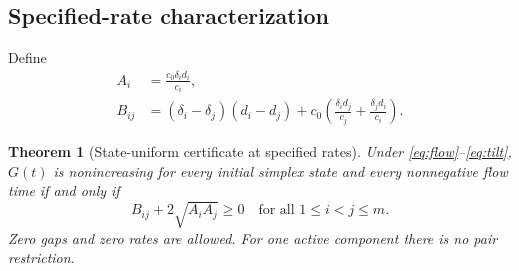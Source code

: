 \documentclass[pdflatex,sn-vancouver-num]{sn-jnl}
\theoremstyle{thmstyleone}
\newtheorem{theorem}{Theorem}
\begin{document}
\subsection{Specified-rate characterization}
Define
\begin{align}
A_i&=\frac{c_0\delta_i d_i}{c_i},\label{eq:A}\\
B_{ij}&=(\delta_i-\delta_j)(d_i-d_j)
+c_0\left(\frac{\delta_i d_j}{c_j}
+\frac{\delta_j d_i}{c_i}\right).\label{eq:B}
\end{align}
\begin{samepage}
\begin{theorem}[State-uniform certificate at specified rates]\label{thm:fixed}
Under \eqref{eq:flow}--\eqref{eq:tilt}, $G(t)$ is nonincreasing for every initial simplex state and every nonnegative flow time if and only if
\begin{equation}\label{eq:criterion}
B_{ij}+2\sqrt{A_iA_j}\ge0
\quad\text{for all }1\le i<j\le m.
\end{equation}
Zero gaps and zero rates are allowed. For one active component there is no pair restriction.
\end{theorem}
\end{samepage}
\end{document}
